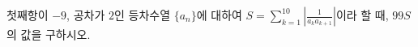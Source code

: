 첫째항이 $-9$, 공차가 $2$인 등차수열 $\{a_n\}$에 대하여 $S=\displaystyle\sum_{k=1}^{10}\left|\frac{1}{a_ka_{k+1}}\right|$이라 할 때, $99S$의 값을 구하시오.
